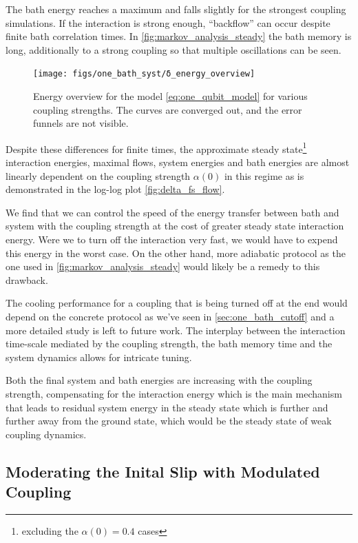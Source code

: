The bath energy reaches a maximum and falls slightly for the strongest
coupling simulations. If the interaction is strong enough,
``backflow'' can occur despite finite bath correlation times. In
\cref{fig:markov_analysis_steady} the bath memory is long,
additionally to a strong coupling so that multiple oscillations can be
seen.
\begin{figure}[htp]
  \centering
  \texttt{[image: figs/one\_bath\_syst/δ\_energy\_overview]}
  \caption{\label{fig:delta_energy_overview} Energy overview for the
    model \cref{eq:one_qubit_model} for various coupling
    strengths. The curves are converged out, and the error funnels are
    not visible.}
\end{figure}

Despite these differences for finite times, the approximate steady
state\footnote{excluding the \(α(0)=0.4\) cases} interaction energies,
maximal flows, system energies and bath energies are almost linearly
dependent on the coupling strength \(α(0)\) in this regime as is
demonstrated in the log-log plot \cref{fig:delta_fs_flow}.

We find that we can control the speed of the energy transfer between
bath and system with the coupling strength at the cost of greater
steady state interaction energy. Were we to turn off the interaction
very fast, we would have to expend this energy in the worst case. On
the other hand, more adiabatic protocol as the one used in
\cref{fig:markov_analysis_steady} would likely be a remedy to this
drawback.

The cooling performance for a coupling that is being turned off at the
end would depend on the concrete protocol as we've seen in
\cref{sec:one_bath_cutoff} and a more detailed study is left to future
work. The interplay between the interaction time-scale mediated by the
coupling strength, the bath memory time and the system dynamics allows
for intricate tuning.

Both the final system and bath energies are increasing with the
coupling strength, compensating for the interaction energy which is
the main mechanism that leads to residual system energy in the steady
state which is further and further away from the ground state, which
would be the steady state of weak coupling dynamics.




\subsection{Moderating the Inital Slip with Modulated Coupling}
\label{sec:moder-init-slip}

